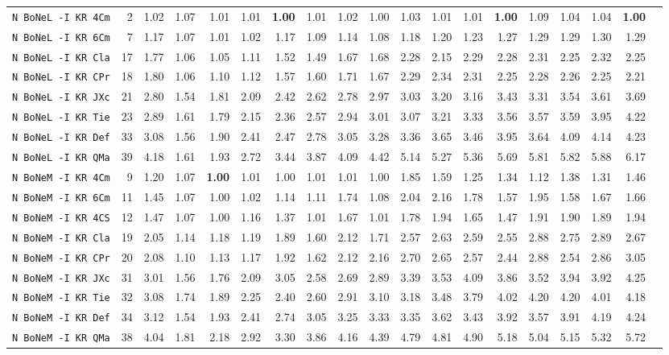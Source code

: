 \begin{tabular}{l | r @{~~} r | r@{~~}r@{~~}r@{~~}r@{~~}r@{~~}r@{~~}r@{~~}r@{~~}r@{~~}r@{~~}r@{~~}r@{~~}r@{~~}r@{~~}r@{~~}r|}
\verb+N BoNeL -I KR 4Cm+ & 2 & 1.02 & 1.07&1.01&1.01&\textbf{1.00}&1.01&1.02&1.00&1.03&1.01&1.01&\textbf{1.00}&1.09&1.04&1.04&\textbf{1.00}\\
\verb+N BoNeL -I KR 6Cm+ & 7 & 1.17 & 1.07&1.01&1.02&1.17&1.09&1.14&1.08&1.18&1.20&1.23&1.27&1.29&1.29&1.30&1.29\\
\verb+N BoNeL -I KR Cla+ & 17 & 1.77 & 1.06&1.05&1.11&1.52&1.49&1.67&1.68&2.28&2.15&2.29&2.28&2.31&2.25&2.32&2.25\\
\verb+N BoNeL -I KR CPr+ & 18 & 1.80 & 1.06&1.10&1.12&1.57&1.60&1.71&1.67&2.29&2.34&2.31&2.25&2.28&2.26&2.25&2.21\\
\verb+N BoNeL -I KR JXc+ & 21 & 2.80 & 1.54&1.81&2.09&2.42&2.62&2.78&2.97&3.03&3.20&3.16&3.43&3.31&3.54&3.61&3.69\\
\verb+N BoNeL -I KR Tie+ & 23 & 2.89 & 1.61&1.79&2.15&2.36&2.57&2.94&3.01&3.07&3.21&3.33&3.56&3.57&3.59&3.95&4.22\\
\verb+N BoNeL -I KR Def+ & 33 & 3.08 & 1.56&1.90&2.41&2.47&2.78&3.05&3.28&3.36&3.65&3.46&3.95&3.64&4.09&4.14&4.23\\
\verb+N BoNeL -I KR QMa+ & 39 & 4.18 & 1.61&1.93&2.72&3.44&3.87&4.09&4.42&5.14&5.27&5.36&5.69&5.81&5.82&5.88&6.17\smallskip \\
\verb+N BoNeM -I KR 4Cm+ & 9 & 1.20 & 1.07&\textbf{1.00}&1.01&1.00&1.01&1.01&1.00&1.85&1.59&1.25&1.34&1.12&1.38&1.31&1.46\\
\verb+N BoNeM -I KR 6Cm+ & 11 & 1.45 & 1.07&1.00&1.02&1.14&1.11&1.74&1.08&2.04&2.16&1.78&1.57&1.95&1.58&1.67&1.66\\
\verb+N BoNeM -I KR 4CS+ & 12 & 1.47 & 1.07&1.00&1.16&1.37&1.01&1.67&1.01&1.78&1.94&1.65&1.47&1.91&1.90&1.89&1.94\\
\verb+N BoNeM -I KR Cla+ & 19 & 2.05 & 1.14&1.18&1.19&1.89&1.60&2.12&1.71&2.57&2.63&2.59&2.55&2.88&2.75&2.89&2.67\\
\verb+N BoNeM -I KR CPr+ & 20 & 2.08 & 1.10&1.13&1.17&1.92&1.62&2.12&2.16&2.70&2.65&2.57&2.44&2.88&2.54&2.86&3.05\\
\verb+N BoNeM -I KR JXc+ & 31 & 3.01 & 1.56&1.76&2.09&3.05&2.58&2.69&2.89&3.39&3.53&4.09&3.86&3.52&3.94&3.92&4.25\\
\verb+N BoNeM -I KR Tie+ & 32 & 3.08 & 1.74&1.89&2.25&2.40&2.60&2.91&3.10&3.18&3.48&3.79&4.02&4.20&4.20&4.01&4.18\\
\verb+N BoNeM -I KR Def+ & 34 & 3.12 & 1.54&1.93&2.41&2.74&3.05&3.25&3.33&3.35&3.62&3.43&3.92&3.57&3.91&4.19&4.24\\
\verb+N BoNeM -I KR QMa+ & 38 & 4.04 & 1.81&2.18&2.92&3.30&3.86&4.16&4.39&4.79&4.81&4.90&5.18&5.04&5.15&5.32&5.72\smallskip \\

\end{tabular}
